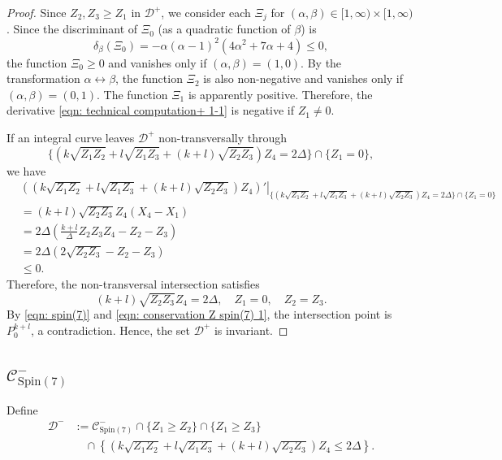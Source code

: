 \documentclass[11pt,letterpaper]{amsart}
\theoremstyle{definition}
\numberwithin{equation}{section}
\newcommand{\spin}{\mathrm{Spin}}
\begin{document}
\begin{proof}
Since $Z_2,Z_3\geq Z_1$ in $\mathcal{D}^+$, we consider each $\Xi_j$ for $(\alpha,\beta)\in [1,\infty)\times [1,\infty)$. Since the discriminant of $\Xi_0$ (as a quadratic function of $\beta$) is 
$$\delta_\beta (\Xi_0)=-\alpha(\alpha-1)^2(4\alpha^2+7\alpha+4)\leq 0,$$
 the function $\Xi_0\geq 0$ and vanishes only if $(\alpha,\beta)=(1,0)$. By the transformation $\alpha\leftrightarrow \beta$, the function $\Xi_2$ is also non-negative and vanishes only if $(\alpha,\beta)=(0,1)$. The function $\Xi_1$ is apparently positive. Therefore, the derivative \eqref{eqn: technical computation+ 1-1} is negative if $Z_1\neq 0$. 

If an integral curve leaves $\mathcal{D}^+$ non-transversally through $$\{\left(k\sqrt{Z_1Z_2}+l\sqrt{Z_1Z_3}+(k+l)\sqrt{Z_2Z_3}\right)Z_4=2\Delta\}\cap \{Z_1=0\},$$ we have
\begin{equation}
\label{eqn: technical computation 1-3}
\begin{split}
&\left.\left(\left(k\sqrt{Z_1Z_2}+l\sqrt{Z_1Z_3}+(k+l)\sqrt{Z_2Z_3}\right)Z_4\right)'\right|_{\{\left(k\sqrt{Z_1Z_2}+l\sqrt{Z_1Z_3}+(k+l)\sqrt{Z_2Z_3}\right)Z_4=2\Delta\}\cap \{Z_1=0\}}
\\
&=(k+l)\sqrt{Z_2Z_3}Z_4(X_4-X_1)\\
&=2\Delta\left(\frac{k+l}{\Delta}Z_2Z_3Z_4-Z_2-Z_3\right)\\
&=2\Delta\left(2\sqrt{Z_2Z_3}-Z_2-Z_3\right)\\
&\leq 0.
\end{split}
\end{equation}
Therefore, the non-transversal intersection satisfies 
$$(k+l)\sqrt{Z_2Z_3}Z_4=2\Delta,\quad Z_1=0,\quad Z_2=Z_3.$$ By \eqref{eqn: spin(7)} and \eqref{eqn: conservation Z spin(7) 1}, the intersection point is $P_0^{k+l}$, a contradiction. Hence, the set $\mathcal{D}^+$ is invariant.
\end{proof}


\subsection{$\mathcal{C}^-_{\spin(7)}$}
\label{subsec_-}
Define 
\begin{equation}
\label{eqn_D-}
\begin{split}
\mathcal{D}^-&:=\mathcal{C}^-_{\spin(7)}\cap \{Z_1\geq Z_2\}\cap \{Z_1\geq Z_3\}\\
&\quad \cap \left\{\left(k\sqrt{Z_1Z_2}+l\sqrt{Z_1Z_3}+(k+l)\sqrt{Z_2Z_3}\right)Z_4\leq 2\Delta\right\}.
\end{split}
\end{equation}
\end{document}
